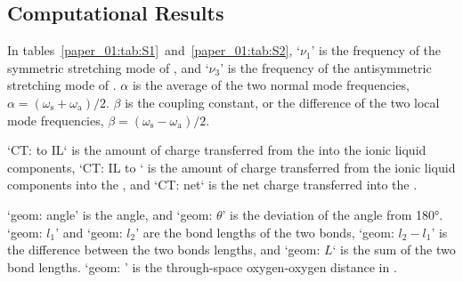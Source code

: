 \documentclass[%
  class = book,%
  crop = false,%
  float = true,%
  multi = true,%
  preview = false,%
]{standalone}
\begin{document}
{\subsection{Computational Results}
\label{anionSI_comp}
In tables~\ref{paper_01:tab:S1}~and~\ref{paper_01:tab:S2}, `\(\nu_1\)' is the frequency of the symmetric stretching mode of , and `\(\nu_3\)' is the frequency of the antisymmetric stretching mode of . \(\alpha\) is the average of the two normal mode frequencies, \(\alpha = (\omega_\mathrm{s} + \omega_\mathrm{a})/2\). \(\beta\) is the coupling constant, or the difference of the two local mode frequencies, \(\beta = (\omega_\mathrm{s} - \omega_\mathrm{a})/2\).

`CT:  to IL` is the amount of charge transferred from the  into the ionic liquid components, `CT: IL to ` is the amount of charge transferred from the ionic liquid components into the , and `CT: net` is the net charge transferred into the .

`geom: angle' is the   angle, and `geom: \(\theta\)' is the deviation of the angle from \ang{180}. `geom: \(l_1\)' and `geom: \(l_2\)' are the bond lengths of the two  bonds, `geom: \(l_2 - l_1\)' is the difference between the two bonds lengths, and `geom: \(L\)` is the sum of the two bond lengths. `geom: ' is the through-space oxygen-oxygen distance in .

}
\end{document}
